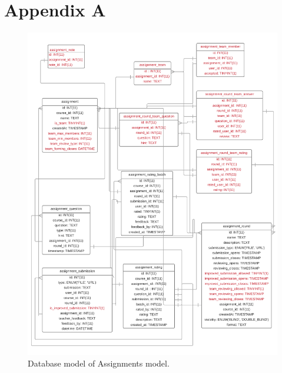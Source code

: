 
\chapter{Appendix A}
\begin{figure}[h]
    \centering
    \includegraphics[width=\textwidth]{images/database.png}
    \caption{Database model of Assignments model.}
    \label{assignmentdatabase}
\end{figure}
